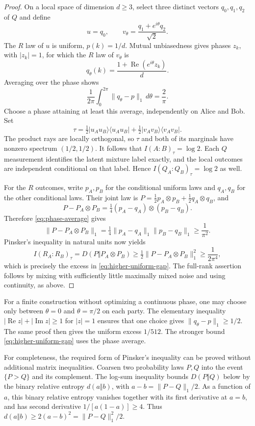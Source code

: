\begin{proof}
 On a local space of dimension $d\geq3$, select three distinct vectors
 $q_0,q_1,q_2$ of $Q$ and define
 \[
  u=q_0,\qquad
  v_\theta=\frac{q_1+e^{i\theta}q_2}{\sqrt2}.
 \]
 The $R$ law of $u$ is uniform, $p(k)=1/d$.  Mutual unbiasedness
 gives phases $z_k$, with $|z_k|=1$, for which the $R$ law of
 $v_\theta$ is
 \[
  q_\theta(k)=\frac{1+\operatorname{Re}(e^{i\theta}z_k)}d.
 \]
 Averaging over the phase shows
 \begin{equation}
  \frac1{2\pi}\int_0^{2\pi}\|q_\theta-p\|_1\,d\theta
  =\frac2\pi.
  \label{eq:phase-average}
 \end{equation}
 Choose a phase attaining at least this average, independently on
 Alice and Bob.  Set
 \[
  \tau=\tfrac12|u_Au_B\rangle\langle u_Au_B|
       +\tfrac12|v_Av_B\rangle\langle v_Av_B|.
 \]
 The product rays are locally orthogonal, so $\tau$ and both of its
 marginals have nonzero spectrum $(1/2,1/2)$.  It follows that
 $I(A:B)_\tau=\log2$.  Each $Q$ measurement identifies the latent
 mixture label exactly, and the local outcomes are independent
 conditional on that label.  Hence $I(Q_A:Q_B)_\tau=\log2$ as well.

 For the $R$ outcomes, write $p_A,p_B$ for the conditional uniform
 laws and $q_A,q_B$ for the other conditional laws.  Their joint law
 is $P=\tfrac12p_A\otimes p_B+\tfrac12q_A\otimes q_B$, and
 \[
  P-P_A\otimes P_B
  =\tfrac14(p_A-q_A)\otimes(p_B-q_B).
 \]
 Therefore \eqref{eq:phase-average} gives
 \[
  \|P-P_A\otimes P_B\|_1
   =\tfrac14\|p_A-q_A\|_1\|p_B-q_B\|_1
   \geq\frac1{\pi^2}.
 \]
 Pinsker's inequality in natural units now yields
 \[
  I(R_A:R_B)_\tau
    =D(P\Vert P_A\otimes P_B)
    \geq\tfrac12\|P-P_A\otimes P_B\|_1^2
    \geq\frac1{2\pi^4},
 \]
 which is precisely the excess in \eqref{eq:higher-uniform-gap}.
 The full-rank assertion follows by mixing with sufficiently little
 maximally mixed noise and using continuity, as above.
\end{proof}

For a finite construction without optimizing a continuous phase,
one may choose only between $\theta=0$ and $\theta=\pi/2$ on each
party.  The elementary inequality $|\operatorname{Re}z|+
|\operatorname{Im}z|\geq1$ for $|z|=1$ ensures that one choice gives
$\|q_\theta-p\|_1\geq1/2$.  The same proof then gives the uniform
excess $1/512$.  The stronger bound \eqref{eq:higher-uniform-gap}
uses the phase average.

For completeness, the required form of Pinsker's inequality can be
proved without additional matrix inequalities.  Coarsen two
probability laws $P,Q$ into the event $\{P>Q\}$ and its complement.
The log-sum inequality bounds $D(P\Vert Q)$ below by the binary
relative entropy $d(a\Vert b)$, with
$a-b=\|P-Q\|_1/2$.  As a function of $a$, this binary relative
entropy vanishes together with its first derivative at $a=b$, and
has second derivative $1/[a(1-a)]\geq4$.  Thus
$d(a\Vert b)\geq2(a-b)^2=\|P-Q\|_1^2/2$.

